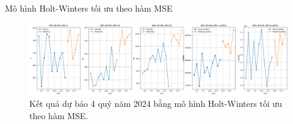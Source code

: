 \begin{frame}{Mô hình Holt-Winters tối ưu theo hàm MSE}
    \begin{figure}[H]
    \centering
    \includegraphics[width = \textwidth]{figure/HW-mse.png}
    \caption{Kết quả dự báo 4 quý năm 2024 bằng mô hình Holt-Winters tối ưu theo hàm MSE.}
\end{figure}
\end{frame}